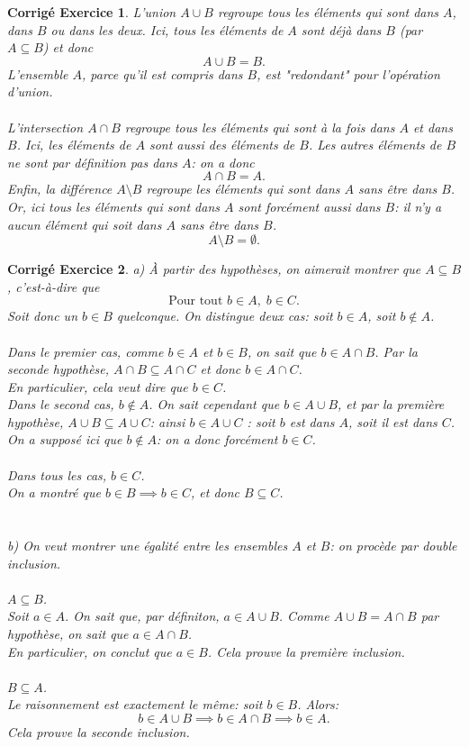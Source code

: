 \documentclass[11pt,french,table]{article}
\theoremstyle{exercice}
\theoremstyle{corrigé}
\newtheorem{corrigé}{Corrigé Exercice}
\begin{document}
\vspace{2em}
\begin{corrigé}
L'union $A \cup B$ regroupe tous les éléments qui sont dans $A$, dans $B$ ou dans les deux. Ici, tous les éléments de $A$ sont déjà dans $B$ (par $A \subseteq B$) et donc $$A \cup B = B.$$ L'ensemble $A$, parce qu'il est compris dans $B$, est "redondant" pour l'opération d'union. \\
\\
L'intersection $A \cap B$ regroupe tous les éléments qui sont \textit{à la fois} dans $A$ et dans $B$. Ici, les éléments de $A$ sont aussi des éléments de $B$. Les autres éléments de $B$ ne sont par définition pas dans $A$: on a donc $$A \cap B = A.$$
\vspace{1em}
Enfin, la différence $A \setminus B$ regroupe les éléments qui sont dans $A$ \textit{sans} être dans $B$. Or, ici tous les éléments qui sont dans $A$ sont forcément aussi dans $B$: il n'y a aucun élément qui soit dans $A$ sans être dans $B$.
$$A \setminus B = \emptyset.$$
\end{corrigé}
\vspace{2em}
\begin{corrigé}
a) À partir des hypothèses, on aimerait montrer que $A \subseteq B$, c'est-à-dire que
$$\text{Pour tout } b \in A, \; b \in C.$$
Soit donc un $b \in B$ quelconque. On distingue deux cas: soit $b \in A$, soit $b \notin A$. \\ \\
Dans le premier cas, comme $b \in A$ et $b \in B$, on sait que $b \in A \cap B$. Par la seconde hypothèse, $A \cap B \subseteq A \cap C$ et donc $b \in A \cap C$. \\
En particulier, cela veut dire que $b \in C$. \\
Dans le second cas, $b \notin A$. On sait cependant que $b \in A \cup B$, et par la première hypothèse, $A \cup B \subseteq A \cup C$: ainsi $b \in A \cup C$ : soit $b$ est dans $A$, soit il est dans $C$. \\
On a supposé ici que $b \notin A$: on a donc forcément $b \in C$. \\
\\
Dans tous les cas, $b \in C$. \\
On a montré que $b \in B \implies b \in C$, et donc $B \subseteq C$. \\ \\ \\
b) On veut montrer une égalité entre les ensembles $A$ et $B$: on procède par double inclusion. \\
\\
\underline{$A \subseteq B$}. \\
Soit $a \in A$. On sait que, par définiton, $a \in A \cup B$. Comme $A \cup B = A \cap B$ par hypothèse, on sait que $a \in A \cap B$. \\
En particulier, on conclut que $a \in B$. Cela prouve la première inclusion. \\
\\
\underline{$B \subseteq A$}. \\
Le raisonnement est exactement le même: soit $b \in B$. Alors:
$$b \in A \cup B \implies b \in A \cap B \implies b \in A.$$
Cela prouve la seconde inclusion.
\end{corrigé}
\end{document}
